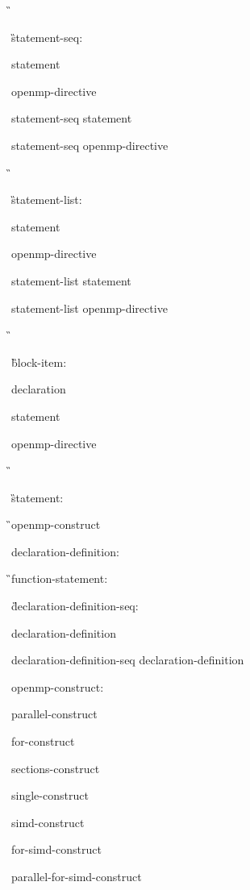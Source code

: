 { %
\I\G\cppspecificstart

\G statement-seq:

\I statement

\I openmp-directive

\I statement-seq statement

\I statement-seq openmp-directive

\G\cppspecificend

\cNinetyspecificstart

\G statement-list:

\I statement

\I openmp-directive

\I statement-list statement

\I statement-list openmp-directive

\G\cNinetyspecificend

\cNinetyNinespecificstart

\G block-item:

\I declaration

\I statement

\I openmp-directive

\G\cNinetyNinespecificend

\G statement:

\C{}

\G\I openmp-construct

\I declaration-definition:

\C\I{}

\G\I function-statement:

\C\I{}

\G declaration-definition-seq:

\I declaration-definition

\I declaration-definition-seq declaration-definition

openmp-construct:

\I parallel-construct

\I for-construct

\I sections-construct

\I single-construct

\I simd-construct

\I for-simd-construct

\I parallel-for-simd-construct

}
